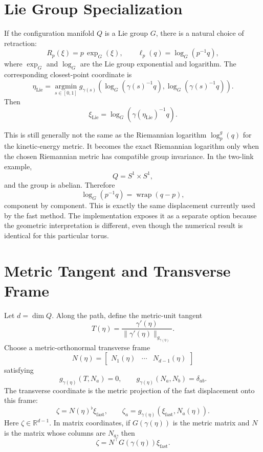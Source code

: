 \documentclass[11pt]{article}
\begin{document}
\section{Lie Group Specialization}

If the configuration manifold \(Q\) is a Lie group \(G\), there is a natural
choice of retraction:
\[
    R_p(\xi)
    =
    p\,\exp_G(\xi),
    \qquad
    \ell_p(q)
    =
    \log_G(p^{-1}q),
\]
where \(\exp_G\) and \(\log_G\) are the Lie group exponential and logarithm.
The corresponding closest-point coordinate is
\[
    \eta_{\mathrm{Lie}}
    =
    \operatorname*{argmin}_{s\in[0,1]}
    g_{\gamma(s)}
    \left(
        \log_G(\gamma(s)^{-1}q),
        \log_G(\gamma(s)^{-1}q)
    \right).
\]
Then
\[
    \xi_{\mathrm{Lie}}
    =
    \log_G(\gamma(\eta_{\mathrm{Lie}})^{-1}q).
\]

This is still generally not the same as the Riemannian logarithm
\(\log^g_p(q)\) for the kinetic-energy metric.  It becomes the exact
Riemannian logarithm only when the chosen Riemannian metric has compatible
group invariance.  In the two-link example,
\[
    Q = S^1\times S^1,
\]
and the group is abelian.  Therefore
\[
    \log_G(p^{-1}q)
    =
    \operatorname{wrap}(q-p),
\]
component by component.  This is exactly the same displacement currently used
by the fast method.  The implementation exposes it as a separate option
because the geometric interpretation is different, even though the numerical
result is identical for this particular torus.

\section{Metric Tangent and Transverse Frame}

Let \(d=\dim Q\).  Along the path, define the metric-unit tangent
\[
    T(\eta)
    =
    \frac{\gamma'(\eta)}
         {\|\gamma'(\eta)\|_{g_{\gamma(\eta)}}}.
\]
Choose a metric-orthonormal transverse frame
\[
    N(\eta)
    =
    \begin{bmatrix}
        N_1(\eta) & \cdots & N_{d-1}(\eta)
    \end{bmatrix}
\]
satisfying
\[
    g_{\gamma(\eta)}(T,N_a)=0,
    \qquad
    g_{\gamma(\eta)}(N_a,N_b)=\delta_{ab}.
\]
The transverse coordinate is the metric projection of the fast displacement
onto this frame:
\[
    \zeta
    =
    N(\eta)^\flat \xi_{\mathrm{fast}},
    \qquad
    \zeta_a
    =
    g_{\gamma(\eta)}
    \left(
        \xi_{\mathrm{fast}},
        N_a(\eta)
    \right).
\]
Here \(\zeta\in\mathbb R^{d-1}\).  In matrix coordinates, if \(G(\gamma(\eta))\)
is the metric matrix and \(N\) is the matrix whose columns are \(N_a\), then
\[
    \zeta
    =
    N^\top G(\gamma(\eta))\xi_{\mathrm{fast}}.
\]
\end{document}

